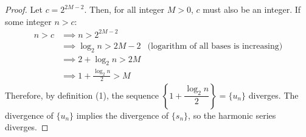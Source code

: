 \documentclass[preview, margin=0.6in]{standalone}
\begin{document}
\begin{proof}
Let $c=2^{2M-2}$. Then, for all integer $M>0$, $c$ must also be an integer. If some integer $n>c$:
\begin{align*}
	n>c 
	&\implies n>2^{2M-2} \\
	&\implies \log_2n>2M-2 & \text{(logarithm of all bases is increasing)} \\
	&\implies 2+\log_2n>2M \\
	&\implies 1+\frac{\log_2n}{2}>M
\end{align*}
Therefore, by definition (1), the sequence $\left\{1+\dfrac{\log_2n}{2}\right\}=\{u_n\}$ diverges. The divergence of $\{u_n\}$ implies the divergence of $\{s_n\}$, so the harmonic series diverges.
\end{proof}
\end{document}
